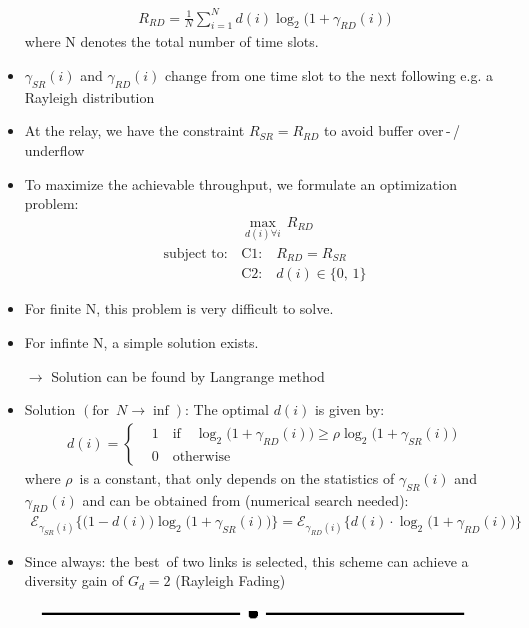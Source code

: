 \documentclass[a4paper, 10pt]{article}
\begin{document}
\begin{itemize}
	\begin{align*}
		R_{RD} = \frac{1}{N}\sum_{i=1}^{N}d(i)\log_2\bigl(1 + \gamma_{RD}(i)\bigr)
	\end{align*}
	where N denotes the total number of time slots.
	\item $\gamma_{SR}(i) $ and $ \gamma_{RD}(i) $ change from one time slot to the next following e.g. a Rayleigh distribution
	\item At the relay, we have the constraint $ R_{SR} = R_{RD} $ to avoid buffer over\,-\,/\,underflow
	\item To maximize the achievable throughput, we formulate an optimization problem:
	\begin{align*}
		&\underset{d(i) \forall i}{\max}\, R_{RD} \\ 
		\text{subject to:}\, &\text{C1:}\quad R_{RD} = R_{SR} \\
		&\text{C2:}\quad d(i) \in \{0,\,1\}
	\end{align*}
	\item For finite N, this problem is very difficult to solve.
	\item For infinte N, a simple solution exists.
	\item[$\rightarrow$] Solution can be found by Langrange method
	\item Solution $(\text{for }\, N \rightarrow \inf )$: The optimal $d(i) $ is given by:
	\begin{align*}
		d(i) = 
		\begin{cases}
			&1\quad \text{if}\quad \log_2\bigl( 1 + \gamma_{RD}(i)\bigr) \geq \rho \log_2\bigl( 1 + \gamma_{SR}(i)\bigr) \\
			&0\quad \text{otherwise} 
		\end{cases}
\end{align*}	 
	where $\rho $\, is a constant, that only depends on the statistics of $\gamma_{SR}(i) $ and $ \gamma_{RD}(i) $ and can be obtained from (numerical search needed):
	\begin{align*}
		\mathcal{E}_{\gamma_{SR}(i)}\bigl\{\bigl(1 - d(i)\bigr)\log_2\bigl(1 + \gamma_{SR}(i)\bigr)\bigr\} = \mathcal{E}_{\gamma_{RD}(i)}\bigl\{d(i)\cdot\log_2\bigl(1 + \gamma_{RD}(i)\bigr)\bigr\}
	\end{align*}
	\item Since always: the \glqq best\grqq\ of two links is selected, this scheme can achieve a diversity gain of $G_d = 2 $ (Rayleigh Fading)
\end{itemize}
\vspace*{3cm}
\begin{figure}[ht]
	\centering
	\includegraphics[scale=1.4]{Ende}
\end{figure}
\end{document}

